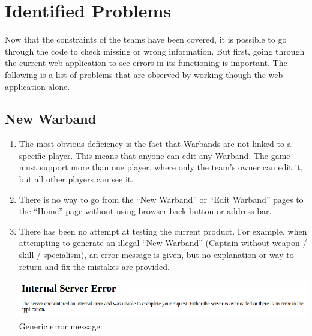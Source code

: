 \documentclass[12pt,a4paper]{article}
\begin{document}
\section{Identified Problems}

Now that the constraints of the teams have been covered, it is possible to go through the code to check missing or wrong information. But first, going through the current web application to see errors in its functioning is important. The following is a list of problems that are observed by working though the web application alone. 

\subsection{New Warband}

\begin{enumerate}
 \item The most obvious deficiency is the fact that Warbands are not linked to a specific player. This means that anyone can edit any Warband. The game must support more than one player, where only the team's owner can edit it, but all other players can see it.
 \item There is no way to go from the ``New Warband'' or ``Edit Warband'' pages to the ``Home'' page without using browser back button or address bar.
 \item There has been no attempt at testing the current product. For example, when attempting to generate an illegal ``New Warband'' (Captain without weapon / skill / specialism), an error message is given, but no explanation or way to return and fix the mistakes are provided.\\
 \begin{minipage}[t]{\linewidth}
 \centering
 \includegraphics[width=1\textwidth]{img/warband_error}
 Generic error message.
 \end{minipage}
 

\end{enumerate}
\end{document}
